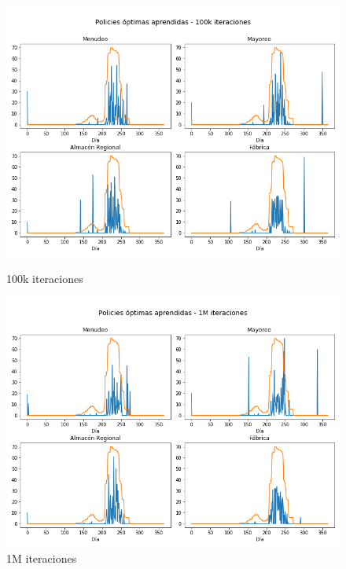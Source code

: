 \begin{figure}[!htb]
   \begin{minipage}{0.48\textwidth}
     \centering
     \includegraphics[width=1\linewidth]{tesis_tex/figs/policyiteration_policies_100000.png}
     \caption{100k iteraciones}\label{politer_policies_100000}
   \end{minipage}\hfill
   \begin{minipage}{0.48\textwidth}
     \centering
     \includegraphics[width=1\linewidth]{tesis_tex/figs/policyiteration_policies_1000000.png}
     \caption{1M iteraciones}\label{politer_policies_1000000}
   \end{minipage}
\end{figure}

